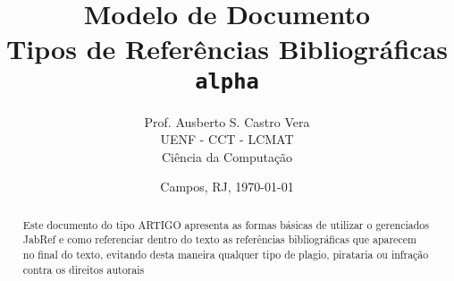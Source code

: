 \documentclass[12pt]{article}
\title{\bf Modelo de Documento \\  Tipos de Refer\^{e}ncias Bibliogr\'{a}ficas \\ \texttt{alpha}}
\author{\textsf{Prof. Ausberto S. Castro Vera} \\
	            UENF - CCT - LCMAT \\
	            Ci\^{e}ncia da Computa\c{c}\~{a}o
	   }
\date{Campos, RJ, \today}    %
\begin{document}
\maketitle     %


\begin{abstract}
Este documento do tipo ARTIGO apresenta as formas b\'{a}sicas de utilizar o gerenciados JabRef e como referenciar dentro do texto as refer\^{e}ncias bibliogr\'{a}ficas que aparecem no final do texto, evitando desta maneira qualquer tipo de plagio, pirataria ou infra\c{c}\~{a}o contra os direitos autorais
\end{abstract}

\newpage
{}
\tableofcontents
\newpage





\end{document}
